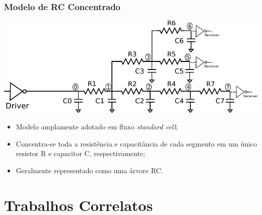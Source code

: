 \documentclass[10pt,a4paper]{beamer}
\begin{document}
				\begin{frame}
					\frametitle{Modelo de RC Concentrado}
					\begin{center}
						\includegraphics[width=\textwidth]{img/lumped_rc.pdf} 
					\end{center}
					\begin{itemize}
						\item Modelo amplamente adotado em fluxo \textit{standard cell};
						\item Concentra-se toda a resistência e capacitância de cada segmento em um único resistor R e capacitor C, respectivamente;
						\item Geralmente representado como uma árvore RC.
					\end{itemize}								
				\end{frame}
			
			
	
	\section{Trabalhos Correlatos}
\end{document}
